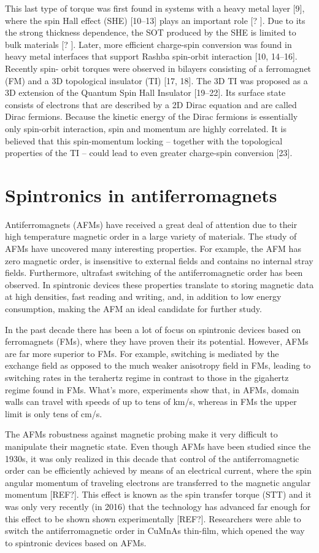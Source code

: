 This last type of torque was first found in systems with a heavy metal layer [9], where the spin Hall
effect (SHE) [10–13] plays an important role [? ]. Due to its the strong thickness dependence, the SOT
produced by the SHE is limited to bulk materials [? ]. Later, more efficient charge-spin conversion was
found in heavy metal interfaces that support Rashba spin-orbit interaction [10, 14–16].
Recently spin- orbit torques were observed in bilayers consisting of a ferromagnet (FM) and a 3D
topological insulator (TI) [17, 18]. The 3D TI was proposed as a 3D extension of the Quantum Spin
Hall Insulator [19–22]. Its surface state consists of electrons that are described by a 2D Dirac
equation and are called Dirac fermions. Because the kinetic energy of the Dirac fermions is essentially
only spin-orbit interaction, spin and momentum are highly correlated. It is believed that this
spin-momentum locking – together with the topological properties of the TI – could lead to even
greater charge-spin conversion [23]. 

\section{Spintronics in antiferromagnets}
Antiferromagnets (AFMs) have received a great deal of attention due to their high temperature magnetic order in a large variety of materials. The study of
AFMs have uncovered many interesting properties. For example, the AFM has zero magnetic order, is
insensitive to external fields and contains no internal stray fields.
Furthermore, ultrafast switching of the antiferromagnetic order has been observed. In
spintronic devices these properties translate to storing magnetic data at high densities, fast
reading and writing, and, in addition to low energy consumption, making the AFM an ideal
candidate for further study.

In the past decade there has been a lot of focus on spintronic devices based on
ferromagnets (FMs), where they have proven their its potential. However,
AFMs are far more superior to FMs. For example, switching is mediated by the
exchange field as opposed to the much weaker anisotropy field in FMs, leading to
switching rates in the terahertz regime in contrast to those in the gigahertz regime found in
FMs. What’s more, experiments show that, in
AFMs, domain walls can travel with speeds of up to tens of km/s, whereas in FMs
the upper limit is only tens of cm/s.

The AFMs robustness against magnetic probing make it very difficult to manipulate their
magnetic state. Even though AFMs have been studied since the 1930s, it was only
realized in this decade that control of the antiferromagnetic order can be efficiently 
achieved by means of an electrical current, where the spin angular momentum of traveling
electrons are transferred to the magnetic angular momentum [REF?]. This effect is
known as the spin transfer torque (STT) and it was only very recently (in 2016) that the
technology has advanced far enough for this effect to be shown shown experimentally
[REF?]. Researchers were able to switch the antiferromagnetic order in CuMnAs thin-film,
which opened the way to spintronic devices based on AFMs.

